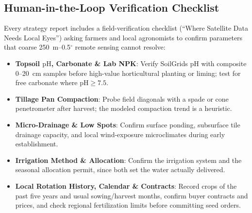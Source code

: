 \subsection{Human-in-the-Loop Verification Checklist}
Every strategy report includes a field-verification checklist (``Where Satellite Data Needs Local Eyes'') asking farmers and local agronomists to confirm parameters that coarse 250~m--0.5$^{\circ}$ remote sensing cannot resolve:
\begin{itemize}[leftmargin=1.5em]
  \item \textbf{Topsoil $\mathrm{pH}$, Carbonate \& Lab NPK}: Verify SoilGrids $\mathrm{pH}$ with composite 0--20~cm samples before high-value horticultural planting or liming; test for free carbonate where $\mathrm{pH} \ge 7.5$.
  \item \textbf{Tillage Pan Compaction}: Probe field diagonals with a spade or cone penetrometer after harvest; the modeled compaction trend is a heuristic.
  \item \textbf{Micro-Drainage \& Low Spots}: Confirm surface ponding, subsurface tile drainage capacity, and local wind-exposure microclimates during early establishment.
  \item \textbf{Irrigation Method \& Allocation}: Confirm the irrigation system and the seasonal allocation permit, since both set the water actually delivered.
  \item \textbf{Local Rotation History, Calendar \& Contracts}: Record crops of the past five years and usual sowing/harvest months, confirm buyer contracts and prices, and check regional fertilization limits before committing seed orders.
\end{itemize}
